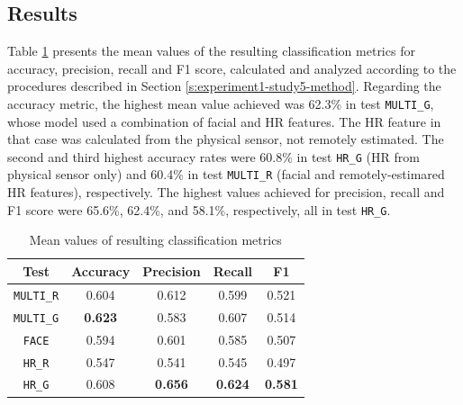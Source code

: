 \subsection{Results}

Table \ref{table:study5-result-metrics-mean} presents the mean values of the resulting classification metrics for accuracy, precision, recall and F1 score, calculated and analyzed according to the procedures described in Section \ref{s:experiment1-study5-method}. Regarding the accuracy metric, the highest mean value achieved was 62.3\% in test \texttt{MULTI\_G}, whose model used a combination of facial and HR features. The HR feature in that case was calculated from the physical sensor, not remotely estimated. The second and third highest accuracy rates were 60.8\% in test \texttt{HR\_G} (HR from physical sensor only) and 60.4\% in test \texttt{MULTI\_R} (facial and remotely-estimared HR features), respectively. The highest values achieved for precision, recall and F1 score were 65.6\%, 62.4\%, and 58.1\%, respectively, all in test \texttt{HR\_G}.

\begin{table}
    \centering
    \caption{Mean values of resulting classification metrics}
    \label{table:study5-result-metrics-mean}
    \begin{tabular}[l]{@{}ccccc}
        \hline
            \textbf{Test} & \textbf{Accuracy} & \textbf{Precision} & \textbf{Recall} & \textbf{F1}\\
        \hline
            \texttt{MULTI\_R} & 0.604 & 0.612 & 0.599 & 0.521 \\ %
            \texttt{MULTI\_G} & \textbf{0.623} & 0.583 & 0.607 & 0.514 \\ %
            \texttt{FACE} & 0.594 & 0.601 & 0.585 & 0.507 \\ %
            \texttt{HR\_R} & 0.547 & 0.541 & 0.545 & 0.497 \\ %
            \texttt{HR\_G} & 0.608 & \textbf{0.656} & \textbf{0.624} & \textbf{0.581} \\ %
        \hline
    \end{tabular}
\end{table}

